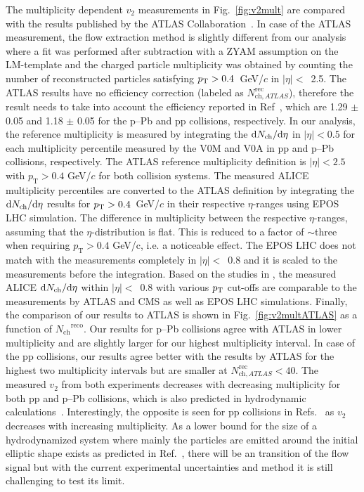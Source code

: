 The multiplicity dependent $v_2$ measurements in Fig.~\ref{fig:v2mult} are compared with the results published by the ATLAS Collaboration~\cite{Aaboud:2016yar}. In case of the ATLAS measurement, the flow extraction method is slightly different from our analysis where a fit was performed after subtraction with a ZYAM assumption on the LM-template and the charged particle multiplicity was obtained by counting the number of reconstructed particles satisfying $p_\mathrm{T}>0.4$~GeV/$c$ in $|\eta|<$~2.5. The ATLAS results have no efficiency correction (labeled as ${N^\mathrm{rec}_{\mathrm{ch},ATLAS}}$), therefore the result needs to take into account the efficiency reported in Ref~\cite{ATLAS:2016yzd}, which are 1.29 $\pm$ 0.05 and 1.18 $\pm$ 0.05 for the p--Pb and pp collisions, respectively. In our analysis, the reference multiplicity is measured by integrating the ${\rm d}N_{\rm ch}/{\rm d}\eta$ in $|\eta|<0.5$ for each multiplicity percentile measured by the V0M and V0A in pp and p--Pb collisions, respectively. The ATLAS reference multiplicity definition is $|\eta|<2.5$ with $p_\mathrm{T}>0.4$ GeV/$c$ for both collision systems. 
The measured ALICE multiplicity percentiles are converted to the ATLAS definition by integrating the ${\rm d}N_{\rm ch}/{\rm d}\eta$ results for $p_\mathrm{T}>0.4$~GeV/$c$ in their respective $\eta$-ranges using EPOS LHC simulation. 
The difference in multiplicity between the respective $\eta$-ranges, assuming that the $\eta$-distribution is flat. This is reduced to a factor of $\sim$three when requiring $p_\mathrm{T}>0.4$ GeV/c, i.e. a noticeable effect.
The EPOS LHC does not match with the measurements completely in $|\eta|<$~0.8 and it is scaled to the measurements before the integration. Based on the studies in \cite{ALICE:Nchpt}, the measured ALICE ${\rm d}N_{\rm ch}/{\rm d}\eta$ within $|\eta|<$~0.8 with various $p_\mathrm{T}$ cut-offs are comparable to the measurements by ATLAS and CMS as well as EPOS LHC simulations. Finally, the comparison of our results to ATLAS is shown in Fig.~\ref{fig:v2multATLAS} as a function of ${N_\mathrm{ch}}^\mathrm{reco}$.  
Our results for p--Pb collisions agree with ATLAS in lower multiplicity and are slightly larger for our highest multiplicity interval. In case of  the pp collisions, our results agree better with the results by ATLAS for the highest two multiplicity intervals but are smaller at ${N^\mathrm{rec}_{\mathrm{ch},ATLAS}}<40$. The measured $v_{2}$ from both experiments decreases with decreasing multiplicity for both pp and p--Pb collisions, which is also predicted in hydrodynamic calculations~\cite{Weller:2017tsr,Taghavi:2019mqz}. Interestingly, the opposite is seen for pp collisions in Refs.~\cite{Schenke:2020mbo} as $v_2$ decreases with increasing
multiplicity. 
As a lower bound for the size of a hydrodynamized
system where mainly the particles are emitted around the initial elliptic shape exists as predicted in Ref.~\cite{Taghavi:2019mqz}, there will be an transition of the flow signal but with the current experimental uncertainties and method it is still challenging to test its limit.



